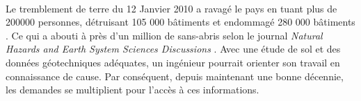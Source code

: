 \paragraph{}
Le tremblement de terre du 12 Janvier 2010 a ravagé le pays en
tuant plus de 200000 personnes, détruisant
105 000 bâtiments et endommagé 280 000 bâtiments \cite{mondiale2010haiti}.
Ce qui a abouti à près d'un million de sans-abris selon  le journal 
\textit{Natural Hazards and Earth System Sciences Discussions} \cite{daniell2013uncovering}.
Avec une 
étude de sol et des données géotechniques adéquates, un ingénieur pourrait orienter son travail
en connaissance de cause. Par conséquent, depuis maintenant une bonne décennie, les demandes
se multiplient pour l'accès à ces informations.  



